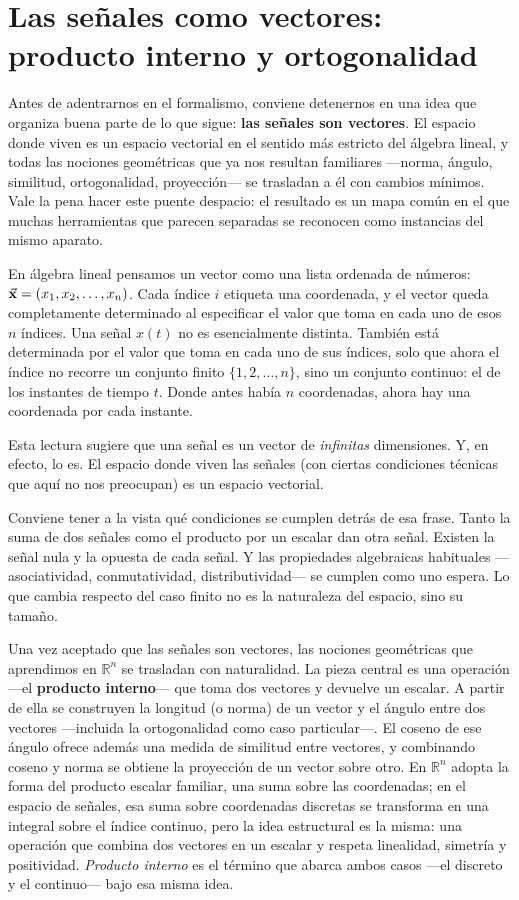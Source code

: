 \documentclass[class=book, crop=false]{standalone}
\begin{document}
\setcounter{chapter}{5}
\section{Las señales como vectores: producto interno y ortogonalidad}
\label{sec:producto_interno}

Antes de adentrarnos en el formalismo, conviene detenernos en una idea que organiza buena parte de lo que sigue: \textbf{las señales son vectores}. El espacio donde viven es un espacio vectorial en el sentido más estricto del álgebra lineal, y todas las nociones geométricas que ya nos resultan familiares —norma, ángulo, similitud, ortogonalidad, proyección— se trasladan a él con cambios mínimos. Vale la pena hacer este puente despacio: el resultado es un mapa común en el que muchas herramientas que parecen separadas se reconocen como instancias del mismo aparato.

En álgebra lineal pensamos un vector como una lista ordenada de números: $\vec{\mathbf{x}} = (x_1, x_2, \ldots, x_n)$. Cada índice $i$ etiqueta una coordenada, y el vector queda completamente determinado al especificar el valor que toma en cada uno de esos $n$ índices. Una señal $x(t)$ no es esencialmente distinta. También está determinada por el valor que toma en cada uno de sus índices, solo que ahora el índice no recorre un conjunto finito $\{1, 2, \ldots, n\}$, sino un conjunto continuo: el de los instantes de tiempo $t$. Donde antes había $n$ coordenadas, ahora hay una coordenada por cada instante.

Esta lectura sugiere que una señal es un vector de \emph{infinitas} dimensiones. Y, en efecto, lo es. El espacio donde viven las señales (con ciertas condiciones técnicas que aquí no nos preocupan) es un espacio vectorial.

Conviene tener a la vista qué condiciones se cumplen detrás de esa frase. Tanto la suma de dos señales como el producto por un escalar dan otra señal. Existen la señal nula y la opuesta de cada señal. Y las propiedades algebraicas habituales —asociatividad, conmutatividad, distributividad— se cumplen como uno espera. Lo que cambia respecto del caso finito no es la naturaleza del espacio, sino su tamaño.

Una vez aceptado que las señales son vectores, las nociones geométricas que aprendimos en $\mathbb{R}^n$ se trasladan con naturalidad. La pieza central es una operación —el \textbf{producto interno}— que toma dos vectores y devuelve un escalar. A partir de ella se construyen la longitud (o norma) de un vector y el ángulo entre dos vectores —incluida la ortogonalidad como caso particular—. El coseno de ese ángulo ofrece además una medida de similitud entre vectores, y combinando coseno y norma se obtiene la proyección de un vector sobre otro. En $\mathbb{R}^n$ adopta la forma del producto escalar familiar, una suma sobre las coordenadas; en el espacio de señales, esa suma sobre coordenadas discretas se transforma en una integral sobre el índice continuo, pero la idea estructural es la misma: una operación que combina dos vectores en un escalar y respeta linealidad, simetría y positividad. \emph{Producto interno} es el término que abarca ambos casos —el discreto y el continuo— bajo esa misma idea.
\end{document}
